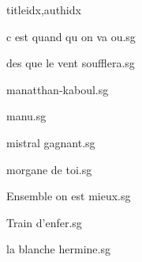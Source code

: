 \documentclass[
    ]{article}
\begin{document}
\begin{songs}{titleidx,authidx}

{c est quand qu on va ou.sg}


{des que le vent soufflera.sg}


{manatthan-kaboul.sg}


{manu.sg}


{mistral gagnant.sg}


{morgane de toi.sg}


{Ensemble on est mieux.sg}


{Train d'enfer.sg}


{la blanche hermine.sg}



\end{songs}
\end{document}
